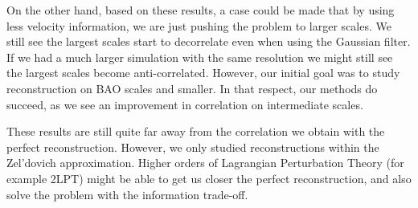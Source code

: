 On the other hand, based on these results, a case could be made that by using less velocity information, we are just pushing the problem to larger scales. We still see the largest scales start to decorrelate even when using the Gaussian filter. If we had a much larger simulation with the same resolution we might still see the largest scales become anti-correlated. However, our initial goal was to study reconstruction on BAO scales and smaller. In that respect, our methods do succeed, as we see an improvement in correlation on intermediate scales.

These results are still quite far away from the correlation we obtain with the perfect reconstruction. However, we only studied reconstructions within the Zel'dovich approximation. Higher orders of Lagrangian Perturbation Theory (for example 2LPT) might be able to get us closer the perfect reconstruction, and also solve the problem with the information trade-off. 

    
    
